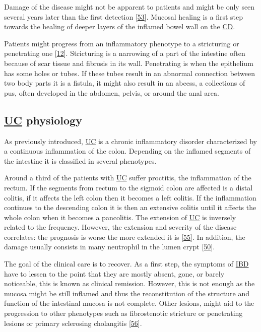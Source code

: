 \documentclass[
  12pt,
  a4paper,
  twoside,
  openright]{book}
\begin{document}
Damage of the disease might not be apparent to patients and might be only seen several years later than the first detection {[}\protect\hyperlink{ref-bhattacharya2016}{53}{]}.
Mucosal healing is a first step towards the healing of deeper layers of the inflamed bowel wall on the \protect\hyperlink{acronyms_CD}{CD}.

Patients might progress from an inflammatory phenotype to a stricturing or penetrating one {[}\protect\hyperlink{ref-satsangi2006}{12}{]}.
Stricturing is a narrowing of a part of the intestine often because of scar tissue and fibrosis in its wall.
Penetrating is when the epithelium has some holes or tubes.
If these tubes result in an abnormal connection between two body parts it is a fistula, it might also result in an abcess, a collections of pus, often developed in the abdomen, pelvis, or around the anal area.

\hypertarget{UC}{%
\subsection{\texorpdfstring{\protect\hyperlink{acronyms_UC}{UC} physiology}{UC physiology}}\label{UC}}

As previously introduced, \protect\hyperlink{acronyms_UC}{UC} is a chronic inflammatory disorder characterized by a continuous inflammation of the colon.
Depending on the inflamed segments of the intestine it is classified in several phenotypes.

Around a third of the patients with \protect\hyperlink{acronyms_UC}{UC} suffer proctitis, the inflammation of the rectum.
If the segments from rectum to the sigmoid colon are affected is a distal colitis, if it affects the left colon then it becomes a left colitis.
If the inflammation continues to the descending colon it is then an extensive colitis until it affects the whole colon when it becomes a pancolitis.
The extension of \protect\hyperlink{acronyms_UC}{UC} is inversely related to the frequency.
However, the extension and severity of the disease correlates: the prognosis is worse the more extended it is {[}\protect\hyperlink{ref-etchevers2009}{55}{]}.
In addition, the damage usually consists in many neutrophil in the lumen crypt {[}\protect\hyperlink{ref-bassolasmolina2018}{50}{]}.

The goal of the clinical care is to recover.
As a first step, the symptoms of \protect\hyperlink{acronyms_IBD}{IBD} have to lessen to the point that they are mostly absent, gone, or barely noticeable, this is known as clinical remission.
However, this is not enough as the mucosa might be still inflamed and thus the reconstitution of the structure and function of the intestinal mucosa is not complete.
Other lesions, might aid to the progression to other phenotypes such as fibrostenotic stricture or penetrating lesions or primary sclerosing cholangitis {[}\protect\hyperlink{ref-boonstra2012}{56}{]}.
\end{document}

